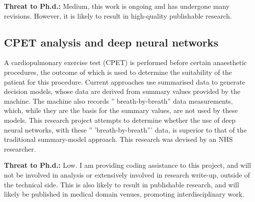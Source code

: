 \documentclass[../main.tex]{subfiles}
\begin{document}
\textbf{Threat to Ph.d.:} Medium, this work is ongoing and has undergone many revisions. However, it is likely to result in high-quality publishable research.

\subsection{CPET analysis and deep neural networks}

A cardiopulmonary exercise test (CPET) is performed before certain anaesthetic procedures, the outcome of which is used to determine the suitability of the patient for this procedure. Current approaches use summarised data to generate decision models, whose data are derived from summary values provided by the machine. The machine also records '' breath-by-breath'' data measurements, which, while they are the basis for the summary values, are not used by these models. This research project attempts to determine whether the use of deep neural networks, with these '' 'breath-by-breath''' data, is superior to that of the traditional summary-model approach. This research was devised by an NHS researcher.

\textbf{Threat to Ph.d.:} Low. I am providing coding assistance to this project, and will not be involved in analysis or extensively involved in research write-up, outside of the technical side. This is also likely to result in publishable research, and will likely be published in medical domain venues, promoting interdisciplinary work.
\end{document}
